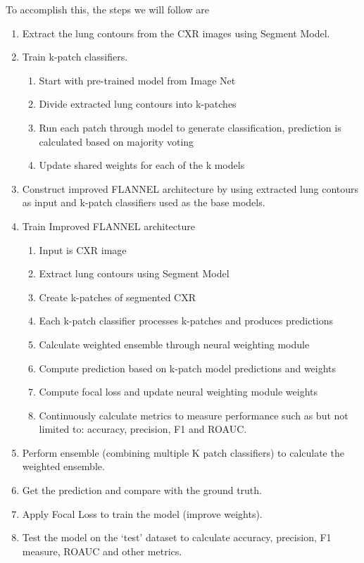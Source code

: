 \documentclass{sigkddExp}
\begin{document}
To accomplish this, the steps we will follow are

\begin{enumerate}
    \item Extract the lung contours from the CXR images using Segment Model.
    \item Train k-patch classifiers.
    \begin{enumerate}
        \item Start with pre-trained model from Image Net
        \item Divide extracted lung contours into k-patches
        \item Run each patch through model to generate classification,
        prediction is calculated based on majority voting
        \item Update shared weights for each of the k models
    \end{enumerate}
    \item Construct improved FLANNEL architecture by using extracted lung
    contours as input and k-patch classifiers used as the base models.
    \item Train Improved FLANNEL architecture
    \begin{enumerate}
        \item Input is CXR image
        \item Extract lung contours using Segment Model
        \item Create k-patches of segmented CXR
        \item Each k-patch classifier processes k-patches and produces predictions
        \item Calculate weighted ensemble through neural weighting module
        \item Compute prediction based on k-patch model predictions and weights
        \item Compute focal loss and update neural weighting module weights
        \item Continuously calculate metrics to measure performance such as but
        not limited to: accuracy, precision, F1 and ROAUC.
    \end{enumerate}
    \item Perform ensemble (combining multiple K patch classifiers) to calculate the weighted ensemble.
    \item Get the prediction and compare with the ground truth.
    \item Apply Focal Loss to train the model (improve weights).
    \item Test the model on the ‘test’ dataset to calculate accuracy, precision, F1 measure, ROAUC and other metrics.
\end{enumerate}
\end{document}
